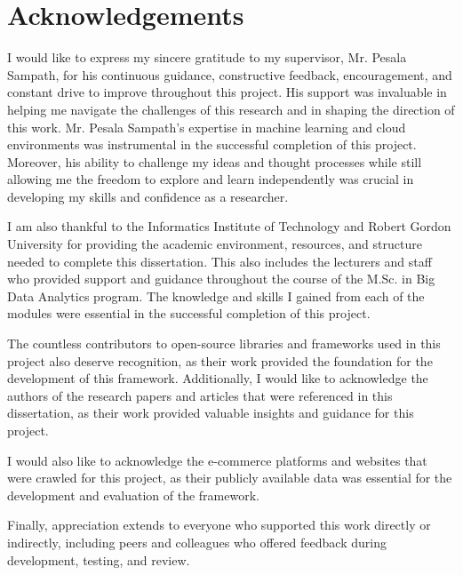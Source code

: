 \chapter*{Acknowledgements}

I would like to express my sincere gratitude to my supervisor, Mr. Pesala Sampath, for his continuous guidance, constructive feedback, encouragement, and constant drive to improve throughout this project.
His support was invaluable in helping me navigate the challenges of this research and in shaping the direction of this work.
Mr. Pesala Sampath's expertise in machine learning and cloud environments was instrumental in the successful completion of this project.
Moreover, his ability to challenge my ideas and thought processes while still allowing me the freedom to explore and learn independently was crucial in developing my skills and confidence as a researcher.

I am also thankful to the Informatics Institute of Technology and Robert Gordon University for providing the academic environment, resources, and structure needed to complete this dissertation.
This also includes the lecturers and staff who provided support and guidance throughout the course of the M.Sc. in Big Data Analytics program.
The knowledge and skills I gained from each of the modules were essential in the successful completion of this project.

The countless contributors to open-source libraries and frameworks used in this project also deserve recognition, as their work provided the foundation for the development of this framework.
Additionally, I would like to acknowledge the authors of the research papers and articles that were referenced in this dissertation, as their work provided valuable insights and guidance for this project.

I would also like to acknowledge the e-commerce platforms and websites that were crawled for this project, as their publicly available data was essential for the development and evaluation of the framework.

Finally, appreciation extends to everyone who supported this work directly or indirectly, including peers and colleagues who offered feedback during development, testing, and review.